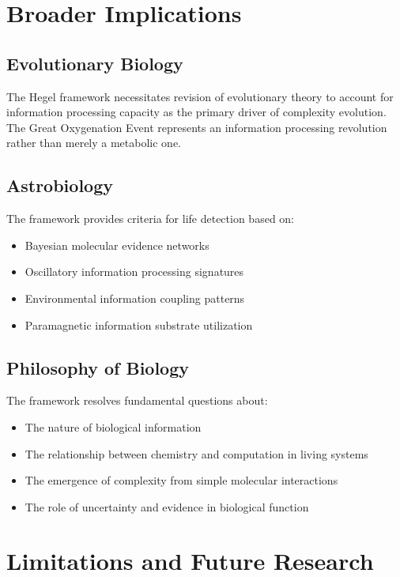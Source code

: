 \documentclass[12pt,a4paper]{article}
\begin{document}
\section{Broader Implications}

\subsection{Evolutionary Biology}

The Hegel framework necessitates revision of evolutionary theory to account for information processing capacity as the primary driver of complexity evolution. The Great Oxygenation Event represents an information processing revolution rather than merely a metabolic one.

\subsection{Astrobiology}

The framework provides criteria for life detection based on:
\begin{itemize}
\item Bayesian molecular evidence networks
\item Oscillatory information processing signatures
\item Environmental information coupling patterns
\item Paramagnetic information substrate utilization
\end{itemize}

\subsection{Philosophy of Biology}

The framework resolves fundamental questions about:
\begin{itemize}
\item The nature of biological information
\item The relationship between chemistry and computation in living systems
\item The emergence of complexity from simple molecular interactions
\item The role of uncertainty and evidence in biological function
\end{itemize}

\section{Limitations and Future Research}
\end{document}
